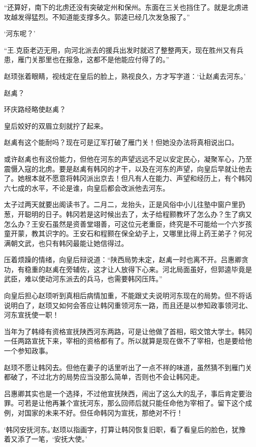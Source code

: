“还算好，南下的北虏还没有突破定州和保州。东面在三关也挡住了。就是北虏进攻越发得猛烈。不知道能支撑多久。郭逵已经几次发急报了。”

‘河东呢？’

“王.克臣老迈无用，向河北派去的援兵出发时就迟了整整两天，现在胜州又有兵患，雁门关那里也在报急，这都不是他能应付得了的。”

赵顼张着眼睛，视线定在皇后的脸上，熟视良久，方才写字道：‘让赵禼去河东。’

赵禼？

环庆路经略使赵禼？

皇后姣好的双眉立刻就拧了起来。

赵禼有这个能耐吗？现在可是辽军打破了雁门关！但她没办法将真相说出口。

或许赵禼也有这份能力，但他在河东的声望远远不足以安定民心，凝聚军心，乃至震慑入寇的北虏。要是赵禼有韩冈的才干，以及在河东的声望，向皇后早就让他去了。她根本就不愿意将韩冈派出京去！但凡有人在能力、声望和经历上，有个韩冈六七成的水平，不论是谁，向皇后都会改派他去河东。

太子过两天就要出阁读书了。二月二，龙抬头，正是风俗中小儿往塾中窗户里扔葱，开聪明的日子。韩冈若是这时候出去了，太子给程颢教坏了怎么办？生了病又怎么办？王安石虽然是资善堂翊善，可这位元老重臣，终究是不可能给一个六岁孩童开蒙，教其识字的。王安石和程颢在保全幼子上，又哪里比得上药王弟子？何况满朝文武，也只有韩冈最能让她信得过。

压着烦躁的情绪，向皇后辩说道：“陕西局势未定，赵禼一时也离不开。吕惠卿贪功，有稳重的赵禼在旁辅佐，这才让人放得下心来。河北局面虽好，但郭逵毕竟是武臣，难以使动河东派去的兵马，也需要韩冈压阵。”

向皇后担心赵顼听到真相后病情加重，不能跟丈夫说明河东现在的局势。但不将话说明白了，赵顼又如何会答应让韩冈重领河东一路，而且还是以参知政事领河北、河东宣抚使一职！

当年为了韩绛有资格宣抚陕西河东两路，可是让他做了首相，昭文馆大学士。韩冈一任两路宣抚下来，宰相的资格都有了。所以就算是现在做不了宰相，也是要给他一个参知政事。

赵顼不愿让韩冈去。但他在妻子的话里听出了一点不祥的味道，虽然猜不到雁门关都破了，不过北方的局势应当没那么简单，否则也不会让韩冈走。

吕惠卿其实也是一个选择，不过他宣抚陕西，闹出了这么大的乱子，事后肯定要治罪。可若是让他再兼个宣抚河东，那么回师后就只能任命他为宰相了。留下这个成例，对国家的未来不好。但任命韩冈为宣抚，那绝对不行！

‘韩冈安抚河东。’赵顼以指画字，打算让韩冈恢复旧职，看了看皇后的脸色，犹豫着又添了一笔，‘安抚大使。’

